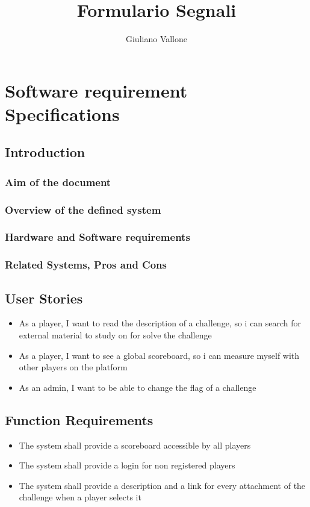 \documentclass[12pt]{article}
\begin{document}
\title{Formulario Segnali}
\author{Giuliano Vallone}
\date{}
\maketitle

\tableofcontents
\newpage

\section{Software requirement Specifications}
\subsection{Introduction}
\subsubsection{Aim of the document}
\subsubsection{Overview of the defined system}
\subsubsection{Hardware and Software requirements}
\subsubsection{Related Systems, Pros and Cons}
\subsection{User Stories}
\begin{itemize}
\item As a player, I want to read the description of a challenge, so i can search for external material to study on for solve the challenge
\item As a player, I want to see a global scoreboard, so i can measure myself with other players on the platform
\item As an admin, I want to be able to change the flag of a challenge
\end{itemize}
\subsection{Function Requirements}
\begin{itemize}
\item The system shall provide a scoreboard accessible by all players
\item The system shall provide a login for non registered players
\item The system shall provide a description and a link for every attachment of the challenge when a player selects it
\end{itemize}
\end{document}
